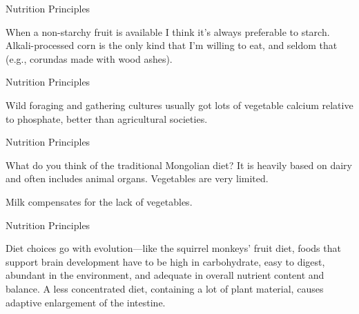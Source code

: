 \documentclass[11pt,oneside,openany,extrafontsizes]{memoir}
\begin{document}
\begin{standalonequote}{Nutrition Principles}

    \begin{answer}
      When a non-starchy fruit is available I think it's always preferable to starch. Alkali-processed corn is the only kind that I'm willing to eat, and seldom that (e.g., corundas made with wood ashes).
    \end{answer}
\end{standalonequote}

\begin{standalonequote}{Nutrition Principles}

    \begin{answer}
      Wild foraging and gathering cultures usually got lots of vegetable calcium relative to phosphate, better than agricultural societies.
    \end{answer}
\end{standalonequote}

\begin{qaexchange}{Nutrition Principles}

    \begin{question}
        What do you think of the traditional Mongolian diet? It is heavily based on dairy and often includes animal organs. Vegetables are very limited. 
    \end{question}

    \begin{answer}
      Milk compensates for the lack of vegetables.
    \end{answer}
\end{qaexchange}

\begin{standalonequote}{Nutrition Principles}

    \begin{answer}
      Diet choices go with evolution—like the squirrel monkeys' fruit diet, foods that support brain development have to be high in carbohydrate, easy to digest, abundant in the environment, and adequate in overall nutrient content and balance. A less concentrated diet, containing a lot of plant material, causes adaptive enlargement of the intestine.
    \end{answer}
\end{standalonequote}
\end{document}

